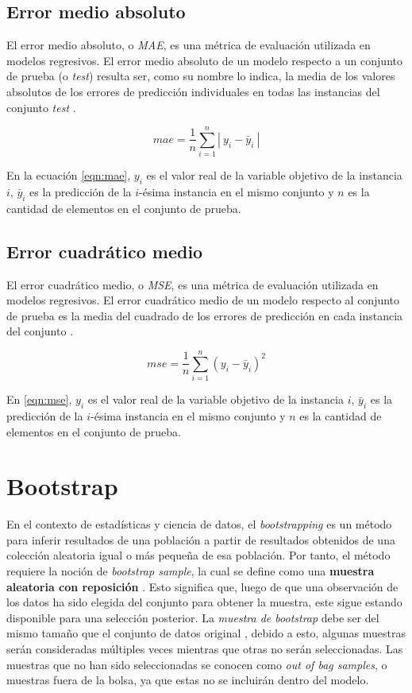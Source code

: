     
    \subsection{Error medio absoluto}
    El error medio absoluto, o \textit{MAE}, es una métrica de evaluación utilizada
    en modelos regresivos. El error medio absoluto de un modelo respecto a un conjunto de prueba (o \textit{test}) resulta ser, como su nombre lo indica, la media de los
    valores absolutos de los errores de predicción individuales en todas las instancias del conjunto \textit{test} \cite{5}.
    
    \begin{equation}\label{eqn:mae}
        mae = \frac{1}{n} \sum_{i=1}^n|~y_i - \bar{y}_i~|
    \end{equation}

    En la ecuación \ref{eqn:mae}, $y_i$ es el valor real de la variable objetivo de la instancia $i$, $\bar{y}_i$ es la predicción de la $i$-ésima instancia en el mismo conjunto
    y $n$ es la cantidad de elementos en el conjunto de prueba.

    \subsection{Error cuadrático medio}
    El error cuadrático medio, o \textit{MSE}, es una métrica de evaluación utilizada
    en modelos regresivos. El error cuadrático medio de un modelo respecto al conjunto de prueba es la media del cuadrado de los errores de predicción 
    en cada instancia del conjunto \cite{4}.

    \begin{equation}\label{eqn:mse}
        mse = \frac{1}{n} \sum_{i=1}^n(y_i - \bar{y}_i)^2
    \end{equation}

    En \ref{eqn:mse}, $y_i$ es el valor real de la variable objetivo de la instancia $i$, $\bar{y}_i$ es la predicción de la $i$-ésima instancia en el mismo conjunto
    y $n$ es la cantidad de elementos en el conjunto de prueba.
%   
%
%
%
\section{Bootstrap}
En el contexto de estadísticas y ciencia de datos, el \textit{bootstrapping} es un método para inferir resultados
de una población a partir de resultados obtenidos de una colección aleatoria igual o más pequeña de esa población. Por tanto, 
el método requiere la noción de \textit{bootstrap sample}, la cual se define como una \textbf{muestra aleatoria con reposición}
\cite{17}. Esto significa que, luego de que una observación de los datos ha sido elegida del conjunto para obtener la muestra, este sigue 
estando disponible para una selección posterior. La \textit{muestra de bootstrap} debe ser del mismo tamaño que el conjunto de datos original \cite{18}, debido a esto, 
algunas muestras serán consideradas múltiples veces mientras que otras no serán seleccionadas. Las muestras que no han sido seleccionadas 
se conocen como \textit{out of bag samples}, o muestras fuera de la bolsa, ya que estas no se incluirán dentro del modelo.

